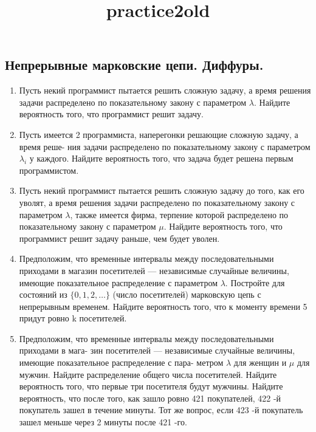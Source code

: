 \documentclass[a4paper, 14pt]{extarticle}
\title{practice2old}
\begin{document}
\subsection*{Непрерывные марковские цепи. Диффуры.}
\begin{enumerate}
\item Пусть некий программист пытается решить сложную задачу, а время решения задачи
распределено по показательному закону с параметром $\lambda$. Найдите вероятность того, что программист
решит задачу.
\item Пусть имеется 2 программиста, наперегонки решающие сложную задачу, а время реше-
ния задачи распределено по показательному закону с параметром $\lambda_i$ у каждого. Найдите вероятность
того, что задача будет решена первым программистом.
\item Пусть некий программист пытается решить сложную задачу до того, как его уволят, а
время решения задачи распределено по показательному закону с параметром $\lambda$, также имеется фирма,
терпение которой распределено по показательному закону с параметром $\mu$. Найдите вероятность того,
что программист решит задачу раньше, чем будет уволен.

\item Предположим, что временные интервалы между последовательными приходами в магазин 
посетителей — независимые случайные величины, имеющие показательное распределение 
с параметром $\lambda$. Постройте для состояний из $\{0, 1, 2, \ldots \}$ (число посетителей) 
марковскую цепь с непрерывным временем. 
Найдите вероятность того, что к моменту времени 5 придут ровно k посетителей.

\item Предположим, что временные интервалы между последовательными приходами в мага-
зин посетителей — независимые случайные величины, имеющие показательное распределение с пара-
метром $\lambda$ для женщин и $\mu$ для мужчин. Найдите распределение общего числа посетителей. Найдите
вероятность того, что первые три посетителя будут мужчины. Найдите вероятность, что после того,
как зашло ровно 421 покупателей, 422 -й покупатель зашел в течение минуты. Тот же вопрос, если
423 -й покупатель зашел меньше через 2 минуты после 421 -го.


\end{enumerate}
\end{document}
